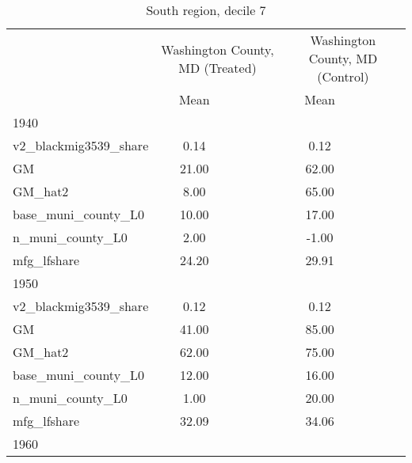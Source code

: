 \begin{table}[htbp]\centering
\def\sym#1{\ifmmode^{#1}\else\(^{#1}\)\fi}
\caption{South region, decile 7 \label{tab1}}
\begin{tabular}{l*{2}{ccc}}
\toprule
                    &\multicolumn{3}{c}{Washington County, MD (Treated)}&\multicolumn{3}{c}{Washington County, MD (Control)}\\
                    &        Mean&            &            &        Mean&            &            \\
\midrule
1940                &            &            &            &            &            &            \\
v2\_blackmig3539\_share&        0.14&            &            &        0.12&            &            \\
GM                  &       21.00&            &            &       62.00&            &            \\
GM\_hat2             &        8.00&            &            &       65.00&            &            \\
base\_muni\_county\_L0 &       10.00&            &            &       17.00&            &            \\
n\_muni\_county\_L0    &        2.00&            &            &       -1.00&            &            \\
mfg\_lfshare         &       24.20&            &            &       29.91&            &            \\
\midrule
1950                &            &            &            &            &            &            \\
v2\_blackmig3539\_share&        0.12&            &            &        0.12&            &            \\
GM                  &       41.00&            &            &       85.00&            &            \\
GM\_hat2             &       62.00&            &            &       75.00&            &            \\
base\_muni\_county\_L0 &       12.00&            &            &       16.00&            &            \\
n\_muni\_county\_L0    &        1.00&            &            &       20.00&            &            \\
mfg\_lfshare         &       32.09&            &            &       34.06&            &            \\
\midrule
1960                &            &            &            &            &            &            \\

\end{tabular}
\end{table}
